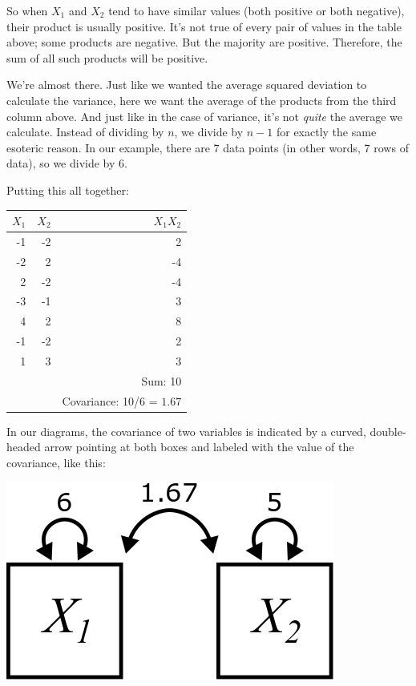 \documentclass[
]{book}
\begin{document}
So when \(X_{1}\) and \(X_{2}\) tend to have similar values (both positive or both negative), their product is usually positive. It's not true of every pair of values in the table above; some products are negative. But the majority are positive. Therefore, the sum of all such products will be positive.

We're almost there. Just like we wanted the average squared deviation to calculate the variance, here we want the average of the products from the third column above. And just like in the case of variance, it's not \emph{quite} the average we calculate. Instead of dividing by \(n\), we divide by \(n - 1\) for exactly the same esoteric reason. In our example, there are 7 data points (in other words, 7 rows of data), so we divide by 6.

Putting this all together:

\begin{longtable}[]{@{}rrr@{}}
\toprule
\(X_{1}\) & \(X_{2}\) & \(X_{1}X_{2}\) \\
\midrule
\endhead
-1 & -2 & 2 \\
-2 & 2 & -4 \\
2 & -2 & -4 \\
-3 & -1 & 3 \\
4 & 2 & 8 \\
-1 & -2 & 2 \\
1 & 3 & 3 \\
& & Sum: 10 \\
& & Covariance: 10/6 = \(\boxed{1.67}\) \\
\bottomrule
\end{longtable}

In our diagrams, the covariance of two variables is indicated by a curved, double-headed arrow pointing at both boxes and labeled with the value of the covariance, like this:

\begin{center}\includegraphics{graphics/covariance_labeled} \end{center}
\end{document}
